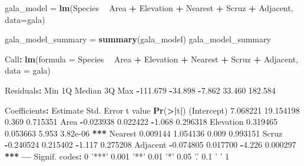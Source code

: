 \documentclass[]{article}
\newenvironment{Shaded}{\begin{snugshade}}{\end{snugshade}}
\newcommand{\KeywordTok}[1]{\textcolor[rgb]{0.13,0.29,0.53}{\textbf{#1}}}
\newcommand{\DataTypeTok}[1]{\textcolor[rgb]{0.13,0.29,0.53}{#1}}
\newcommand{\DecValTok}[1]{\textcolor[rgb]{0.00,0.00,0.81}{#1}}
\newcommand{\FloatTok}[1]{\textcolor[rgb]{0.00,0.00,0.81}{#1}}
\newcommand{\StringTok}[1]{\textcolor[rgb]{0.31,0.60,0.02}{#1}}
\newcommand{\OperatorTok}[1]{\textcolor[rgb]{0.81,0.36,0.00}{\textbf{#1}}}
\newcommand{\ErrorTok}[1]{\textcolor[rgb]{0.64,0.00,0.00}{\textbf{#1}}}
\newcommand{\NormalTok}[1]{#1}
\begin{document}
\begin{Shaded}
\begin{Highlighting}[]
\NormalTok{gala_model =}\StringTok{ }\KeywordTok{lm}\NormalTok{(Species }\OperatorTok{~}\StringTok{ }\NormalTok{Area }\OperatorTok{+}\StringTok{ }\NormalTok{Elevation }\OperatorTok{+}\StringTok{ }\NormalTok{Nearest }\OperatorTok{+}\StringTok{ }\NormalTok{Scruz }\OperatorTok{+}\StringTok{ }\NormalTok{Adjacent, }\DataTypeTok{data=}\NormalTok{gala)}

\NormalTok{gala_model_summary =}\StringTok{ }\KeywordTok{summary}\NormalTok{(gala_model)}
\NormalTok{gala_model_summary}

\NormalTok{Call}\OperatorTok{:}
\KeywordTok{lm}\NormalTok{(}\DataTypeTok{formula =}\NormalTok{ Species }\OperatorTok{~}\StringTok{ }\NormalTok{Area }\OperatorTok{+}\StringTok{ }\NormalTok{Elevation }\OperatorTok{+}\StringTok{ }\NormalTok{Nearest }\OperatorTok{+}\StringTok{ }\NormalTok{Scruz }\OperatorTok{+}\StringTok{ }\NormalTok{Adjacent, }
    \DataTypeTok{data =}\NormalTok{ gala)}

\NormalTok{Residuals}\OperatorTok{:}
\StringTok{     }\NormalTok{Min       1Q   Median       3Q      Max }
\OperatorTok{-}\FloatTok{111.679}  \OperatorTok{-}\FloatTok{34.898}   \OperatorTok{-}\FloatTok{7.862}   \FloatTok{33.460}  \FloatTok{182.584} 

\NormalTok{Coefficients}\OperatorTok{:}
\StringTok{             }\NormalTok{Estimate Std. Error t value }\KeywordTok{Pr}\NormalTok{(}\OperatorTok{>}\ErrorTok{|}\NormalTok{t}\OperatorTok{|}\NormalTok{)    }
\NormalTok{(Intercept)  }\FloatTok{7.068221}  \FloatTok{19.154198}   \FloatTok{0.369} \FloatTok{0.715351}    
\NormalTok{Area        }\OperatorTok{-}\FloatTok{0.023938}   \FloatTok{0.022422}  \OperatorTok{-}\FloatTok{1.068} \FloatTok{0.296318}    
\NormalTok{Elevation    }\FloatTok{0.319465}   \FloatTok{0.053663}   \FloatTok{5.953} \FloatTok{3.82e-06} \OperatorTok{**}\ErrorTok{*}
\NormalTok{Nearest      }\FloatTok{0.009144}   \FloatTok{1.054136}   \FloatTok{0.009} \FloatTok{0.993151}    
\NormalTok{Scruz       }\OperatorTok{-}\FloatTok{0.240524}   \FloatTok{0.215402}  \OperatorTok{-}\FloatTok{1.117} \FloatTok{0.275208}    
\NormalTok{Adjacent    }\OperatorTok{-}\FloatTok{0.074805}   \FloatTok{0.017700}  \OperatorTok{-}\FloatTok{4.226} \FloatTok{0.000297} \OperatorTok{**}\ErrorTok{*}
\OperatorTok{---}
\NormalTok{Signif. codes}\OperatorTok{:}\StringTok{  }\DecValTok{0} \StringTok{'***'} \FloatTok{0.001} \StringTok{'**'} \FloatTok{0.01} \StringTok{'*'} \FloatTok{0.05} \StringTok{'.'} \FloatTok{0.1} \StringTok{' '} \DecValTok{1}


\end{Highlighting}
\end{Shaded}
\end{document}
